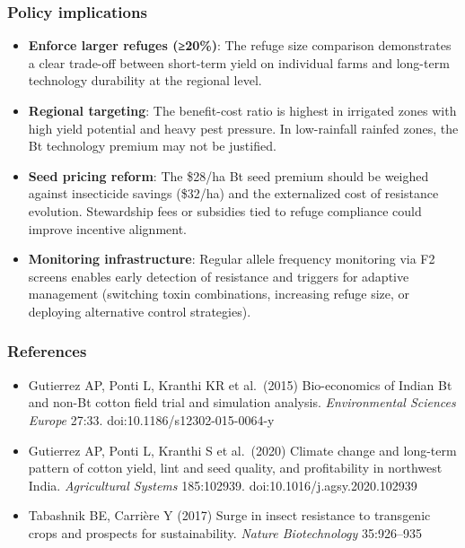 \subsubsection{Policy implications}



\label{2334421071659522563}{}


\begin{itemize}
\item \textbf{Enforce larger refuges (≥20\%)}: The refuge size comparison demonstrates a clear trade-off between short-term yield on individual farms and long-term technology durability at the regional level.


\item \textbf{Regional targeting}: The benefit-cost ratio is highest in irrigated zones with high yield potential and heavy pest pressure. In low-rainfall rainfed zones, the Bt technology premium may not be justified.


\item \textbf{Seed pricing reform}: The \$28/ha Bt seed premium should be weighed against insecticide savings (\$32/ha) and the externalized cost of resistance evolution. Stewardship fees or subsidies tied to refuge compliance could improve incentive alignment.


\item \textbf{Monitoring infrastructure}: Regular allele frequency monitoring via F2 screens enables early detection of resistance and triggers for adaptive management (switching toxin combinations, increasing refuge size, or deploying alternative control strategies).

\end{itemize}


\subsubsection{References}



\label{14148394603223710272}{}


\begin{itemize}
\item Gutierrez AP, Ponti L, Kranthi KR et al.~(2015) Bio-economics of Indian Bt and non-Bt cotton field trial and simulation analysis. \emph{Environmental Sciences Europe} 27:33. doi:10.1186/s12302-015-0064-y


\item Gutierrez AP, Ponti L, Kranthi S et al.~(2020) Climate change and long-term pattern of cotton yield, lint and seed quality, and profitability in northwest India. \emph{Agricultural Systems} 185:102939. doi:10.1016/j.agsy.2020.102939


\item Tabashnik BE, Carrière Y (2017) Surge in insect resistance to transgenic crops and prospects for sustainability. \emph{Nature Biotechnology} 35:926–935

\end{itemize}


